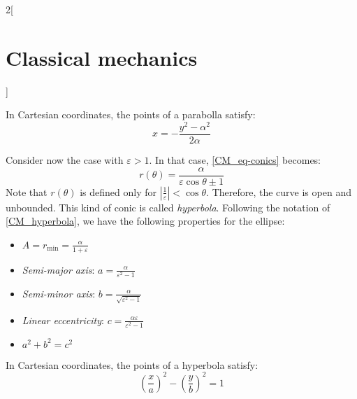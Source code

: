 \documentclass[../../../main.tex]{subfiles}
\begin{document}
\begin{multicols}{2}[\section{Classical mechanics}]
\begin{definition}[Parabolla: $\varepsilon=1$]
    In Cartesian coordinates, the points of a parabolla satisfy: $$x=-\frac{y^2-\alpha^2}{2\alpha}$$
  \end{definition}
  \begin{definition}
    Consider now the case with $\varepsilon>1$. In that case, \cref{CM_eq-conics} becomes: $$r(\theta)=\frac{\alpha}{\varepsilon\cos\theta\pm 1}$$ Note that $r(\theta)$ is defined only for $\left|\frac{1}{\varepsilon}\right|<\cos\theta$. Therefore, the curve is open and unbounded. This kind of conic is called \emph{hyperbola}.
    Following the notation of \cref{CM_hyperbola}, we have the following properties for the ellipse:
    \begin{itemize}
      \item $\displaystyle A=r_\text{min}=\frac{\alpha}{1+\varepsilon}$
      \item \emph{Semi-major axis}: $\displaystyle a=\frac{\alpha}{\varepsilon^2-1}$
      \item \emph{Semi-minor axis}: $\displaystyle b=\frac{\alpha}{\sqrt{\varepsilon^2-1}}$
      \item \emph{Linear eccentricity}: $\displaystyle c=\frac{\alpha\varepsilon}{\varepsilon^2-1}$
      \item $a^2+b^2=c^2$
    \end{itemize}
    \begin{center}
      \begin{minipage}{\linewidth}
        \centering
        
        \label{CM_hyperbola}
      \end{minipage}
    \end{center}
    In Cartesian coordinates, the points of a hyperbola satisfy: $${\left(\frac{x}{a}\right)}^2-{\left(\frac{y}{b}\right)}^2=1$$
  \end{definition}

\end{multicols}
\end{document}
